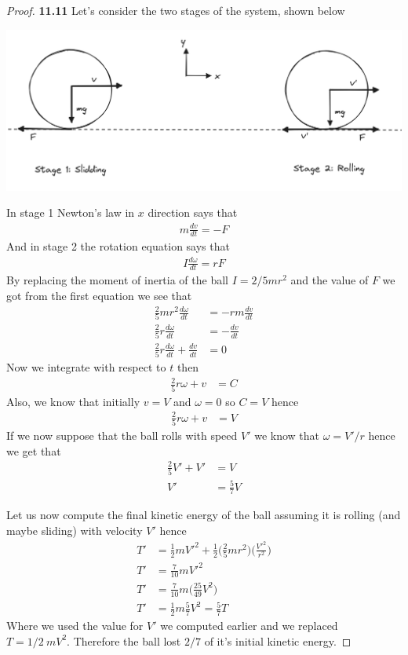 \documentclass[11pt]{article}
\theoremstyle{definition}
\begin{document}
\begin{proof}{\textbf{11.11}}
    Let's consider the two stages of the system, shown below
    \begin{center}
        \includegraphics[scale=0.30]{ch11-11.png}
    \end{center}
    In stage 1 Newton's law in $x$ direction says that
    \begin{align*}
        m\frac{dv}{dt} = -F
    \end{align*}
    And in stage 2 the rotation equation says that
    \begin{align*}
        I \frac{d\omega}{dt} = rF
    \end{align*}
    By replacing the moment of inertia of the ball $I = 2/5 m r^2$ and
    the value of $F$ we got from the first equation we see that
    \begin{align*}
        \frac{2}{5}mr^2\frac{d\omega}{dt} &= -r m\frac{dv}{dt}\\
        \frac{2}{5}r\frac{d\omega}{dt} &= -\frac{dv}{dt}\\
        \frac{2}{5}r\frac{d\omega}{dt} + \frac{dv}{dt} &= 0
    \end{align*}
    Now we integrate with respect to $t$ then
    \begin{align*}
        \frac{2}{5}r\omega + v &= C
    \end{align*}
    Also, we know that initially $v = V$ and $\omega = 0$ so $C = V$ hence
    \begin{align*}
        \frac{2}{5}r\omega + v &= V
    \end{align*}
    If we now suppose that the ball rolls with speed $V'$ we know that
    $\omega = V'/r$ hence we get that
    \begin{align*}
        \frac{2}{5}V' + V' &= V\\
        V' &= \frac{5}{7}V
    \end{align*}
    
    Let us now compute the final kinetic energy of the ball assuming it is
    rolling (and maybe sliding) with velocity $V'$ hence
    \begin{align*}
        T' &= \frac{1}{2}mV'^2 +
        \frac{1}{2}\bigg(\frac{2}{5}m r^2\bigg)\bigg(\frac{V'^2}{r^2}\bigg)\\
        T' &= \frac{7}{10}mV'^2\\
        T' &= \frac{7}{10}m\bigg(\frac{25}{49}V^2\bigg)\\
        T' &= \frac{1}{2}m\frac{5}{7}V^2 = \frac{5}{7}T
    \end{align*}
    Where we used the value for $V'$ we computed earlier and we replaced
    $T = 1/2 ~mV^2$. Therefore the ball lost $2/7$ of it's initial kinetic
    energy.
\end{proof}
\end{document}
